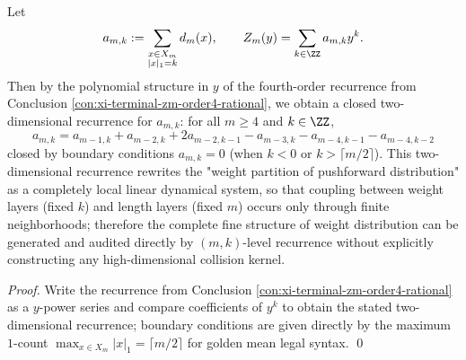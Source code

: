 \begin{conclusion}\label{con:xi-terminal-zm-2d-recurrence-amk}
Let
\[
a_{m,k}:=\sum_{\substack{x\in X_m\\ |x|_1=k}} d_m(x),
\qquad
Z_m(y)=\sum_{k\in\ZZ} a_{m,k}y^k .
\]
Then by the polynomial structure in \(y\) of the fourth-order recurrence from Conclusion \ref{con:xi-terminal-zm-order4-rational}, we obtain a closed two-dimensional recurrence for \(a_{m,k}\):
for all \(m\ge 4\) and \(k\in\ZZ\),
\[
\boxed{\;
a_{m,k}=a_{m-1,k}+a_{m-2,k}+2a_{m-2,k-1}-a_{m-3,k}-a_{m-4,k-1}-a_{m-4,k-2}\;}
\]
closed by boundary conditions \(a_{m,k}=0\) (when \(k<0\) or \(k>\lceil m/2\rceil\)).
This two-dimensional recurrence rewrites the "weight partition of pushforward distribution" as a completely local linear dynamical system, so that coupling between weight layers (fixed \(k\)) and length layers (fixed \(m\)) occurs only through finite neighborhoods;
therefore the complete fine structure of weight distribution can be generated and audited directly by \((m,k)\)-level recurrence without explicitly constructing any high-dimensional collision kernel.
\end{conclusion}
\begin{proof}
Write the recurrence from Conclusion \ref{con:xi-terminal-zm-order4-rational} as a \(y\)-power series and compare coefficients of \(y^k\) to obtain the stated two-dimensional recurrence;
boundary conditions are given directly by the maximum \(1\)-count \(\max_{x\in X_m}|x|_1=\lceil m/2\rceil\) for golden mean legal syntax. \qed
\end{proof}



